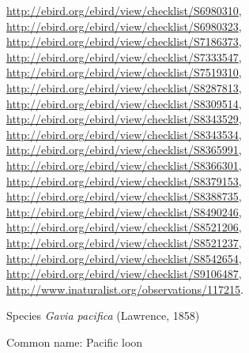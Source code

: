 \documentclass[9pt, article]{memoir}
\begin{document}
\begin{multicols}{2}
\url{http://ebird.org/ebird/view/checklist/S6980310}, 
\url{http://ebird.org/ebird/view/checklist/S6980323}, 
\url{http://ebird.org/ebird/view/checklist/S7186373}, 
\url{http://ebird.org/ebird/view/checklist/S7333547}, 
\url{http://ebird.org/ebird/view/checklist/S7519310}, 
\url{http://ebird.org/ebird/view/checklist/S8287813}, 
\url{http://ebird.org/ebird/view/checklist/S8309514}, 
\url{http://ebird.org/ebird/view/checklist/S8343529}, 
\url{http://ebird.org/ebird/view/checklist/S8343534}, 
\url{http://ebird.org/ebird/view/checklist/S8365991}, 
\url{http://ebird.org/ebird/view/checklist/S8366301}, 
\url{http://ebird.org/ebird/view/checklist/S8379153}, 
\url{http://ebird.org/ebird/view/checklist/S8388735}, 
\url{http://ebird.org/ebird/view/checklist/S8490246}, 
\url{http://ebird.org/ebird/view/checklist/S8521206}, 
\url{http://ebird.org/ebird/view/checklist/S8521237}, 
\url{http://ebird.org/ebird/view/checklist/S8542654}, 
\url{http://ebird.org/ebird/view/checklist/S9106487}, 
\url{http://www.inaturalist.org/observations/117215}.

\vspace{6pt}\noindent\hspace{36pt}Species \textit{Gavia pacifica} (Lawrence, 1858)


Common name: Pacific loon


\end{multicols}
\end{document}
